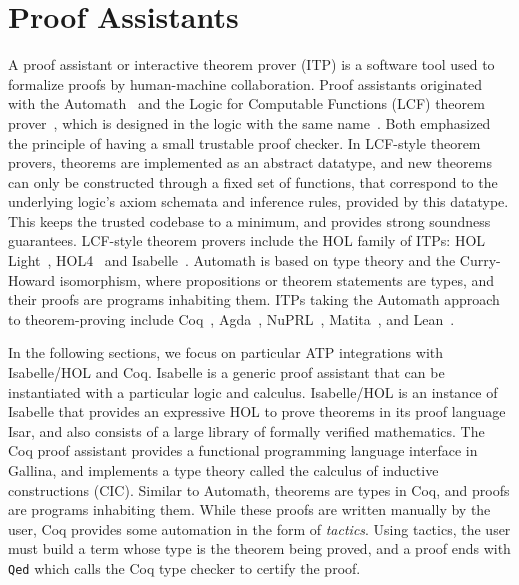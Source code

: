 \documentclass{article}
\begin{document}
\section{Proof Assistants}
\label{sec:itp}
A proof assistant or interactive theorem prover 
(ITP) is a software tool used to formalize
proofs by human-machine collaboration.
Proof assistants originated with the 
Automath~\cite{10.1007/BFb0060623} and 
the Logic for Computable Functions (LCF) 
theorem prover~\cite{10.5555/891954}, 
which is designed in the logic with the 
same name~\cite{Loeckx1987}. Both emphasized the 
principle of having a small trustable proof 
checker. In LCF-style theorem provers, theorems 
are implemented as an abstract datatype, and 
new theorems can only be constructed through a 
fixed set of functions, that correspond to the 
underlying logic's axiom schemata and inference 
rules, provided by this datatype. This keeps
the trusted codebase to a minimum, and 
provides strong soundness guarantees. LCF-style 
theorem provers
include the HOL family of ITPs: 
HOL Light~\cite{10.1007/978-3-642-03359-9_4}, 
HOL4~\cite{10.1007/978-3-540-71067-7_6} and
Isabelle~\cite{10.1007/978-3-540-71067-7_7}. 
Automath is based on type theory and the 
Curry-Howard isomorphism, where 
propositions or theorem statements are types, 
and their proofs are programs inhabiting them. 
ITPs taking the Automath approach to 
theorem-proving include Coq~\cite{Thery2006},
Agda~\cite{10.1007/978-3-642-03359-9_6}, 
NuPRL~\cite{Jac96}, 
Matita~\cite{10.5555/2032266.2032273}, 
and Lean~\cite{10.1007/978-3-319-21401-6_26}.

In the following sections, we focus on 
particular ATP integrations with Isabelle/HOL 
and Coq. Isabelle is a generic proof assistant 
that can be instantiated with a particular 
logic and calculus. Isabelle/HOL is an instance 
of Isabelle that provides an expressive HOL to 
prove theorems in its proof language Isar, 
and also consists of a 
large library of formally verified mathematics. 
The Coq proof assistant provides a functional 
programming language interface in Gallina, and 
implements a type theory called the calculus of 
inductive constructions (CIC). Similar to 
Automath, theorems are types in Coq, and 
proofs are programs inhabiting them. While these 
proofs are written manually by the user, Coq 
provides some automation in the form of 
\textit{tactics}. Using tactics, the user 
must build a term whose type is the theorem 
being proved, and a proof ends with 
\texttt{Qed} which calls the Coq type checker 
to certify the proof.	
	
\end{document}
